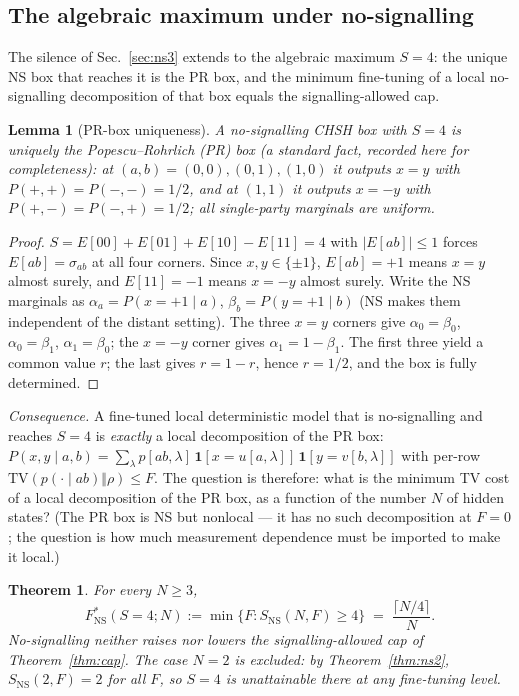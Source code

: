 \documentclass[aps,pra,reprint,superscriptaddress,floatfix]{revtex4-2}
\newcommand{\TV}{\mathrm{TV}}
\newtheorem{lemma}{Lemma}
\newtheorem{theorem}{Theorem}
\begin{document}
\subsection{The algebraic maximum under no-signalling}
\label{sec:ns4}

The silence of Sec.~\ref{sec:ns3} extends to the algebraic maximum $S=4$:
the unique NS box that reaches it is the PR box, and the minimum
fine-tuning of a local no-signalling decomposition of that box equals the
signalling-allowed cap.

\begin{lemma}[PR-box uniqueness]
\label{lem:pr}
A no-signalling CHSH box with $S=4$ is uniquely the
Popescu--Rohrlich (PR) box \cite{pr1994} (a standard fact, recorded here for completeness): at $(a,b)=(0,0),(0,1),(1,0)$ it outputs
$x=y$ with $P(+,+)=P(-,-)=1/2$, and at $(1,1)$ it outputs $x=-y$ with
$P(+,-)=P(-,+)=1/2$; all single-party marginals are uniform.
\end{lemma}

\begin{proof}
$S=E[00]+E[01]+E[10]-E[11]=4$ with $|E[ab]|\le1$ forces
$E[ab]=\sigma_{ab}$ at all four corners. Since $x,y\in\{\pm1\}$,
$E[ab]=+1$ means $x=y$ almost surely, and $E[11]=-1$ means
$x=-y$ almost surely. Write the NS marginals as
$\alpha_a=P(x{=}{+}1\mid a)$, $\beta_b=P(y{=}{+}1\mid b)$ (NS makes them
independent of the distant setting). The three $x=y$ corners give
$\alpha_0=\beta_0$, $\alpha_0=\beta_1$, $\alpha_1=\beta_0$; the $x=-y$
corner gives $\alpha_1=1-\beta_1$. The first three yield a common value
$r$; the last gives $r=1-r$, hence $r=1/2$, and the box is fully
determined.
\end{proof}

\noindent
\emph{Consequence.} A fine-tuned local deterministic model that is
no-signalling and reaches $S=4$ is \emph{exactly} a local decomposition of
the PR box:
$P(x,y\mid a,b)=\sum_\lambda p[ab,\lambda]\,
\mathbf{1}[x=u[a,\lambda]]\,\mathbf{1}[y=v[b,\lambda]]$ with per-row
$\TV(p(\cdot\mid ab)\Vert\rho)\le F$. The question is therefore: what is
the minimum TV cost of a local decomposition of the PR box, as a function
of the number $N$ of hidden states? (The PR box is NS but nonlocal --- it
has no such decomposition at $F=0$; the question is how much measurement
dependence must be imported to make it local.)

\begin{theorem}
\label{thm:ns4cap}
For every $N\ge3$,
\begin{equation}
F^*_{\mathrm{NS}}(S{=}4;N) := \min\{F : S_{\mathrm{NS}}(N,F)\ge 4\}
\;=\; \frac{\lceil N/4\rceil}{N}.
\label{eq:ns4cap}
\end{equation}
No-signalling neither raises nor lowers the signalling-allowed cap of
Theorem~\ref{thm:cap}. The case $N=2$ is excluded: by
Theorem~\ref{thm:ns2}, $S_{\mathrm{NS}}(2,F)=2$ for all $F$, so $S=4$ is
unattainable there at any fine-tuning level.
\end{theorem}
\end{document}
